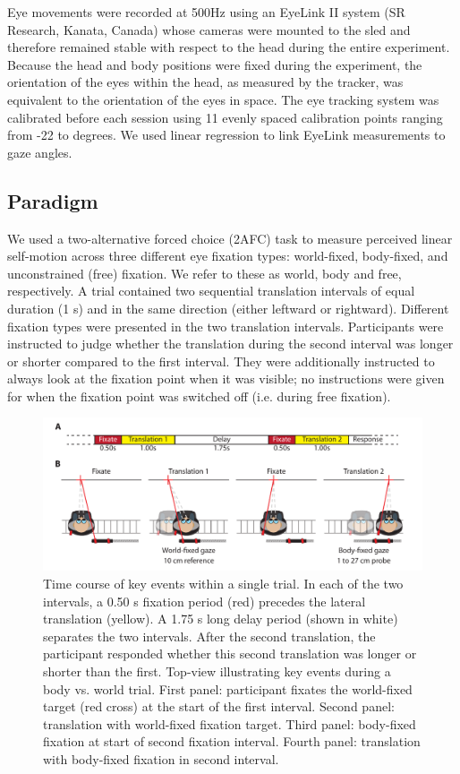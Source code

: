 Eye movements were recorded at 500\si{\hertz} using an EyeLink II system (SR Research, Kanata, Canada) whose cameras were mounted to the sled and therefore remained stable with respect to the head during the entire experiment. Because the head and body positions were fixed during the experiment, the orientation of the eyes within the head, as measured by the tracker, was equivalent to the orientation of the eyes in space. The eye tracking system was calibrated before each session using 11 evenly spaced calibration points ranging from -22 to  degrees. We used linear regression to link EyeLink measurements to gaze angles.

\subsection{Paradigm}
We used a two-alternative forced choice (2AFC) task to measure perceived linear self-motion across three different eye fixation types: world-fixed, body-fixed, and unconstrained (free) fixation. We refer to these as world, body and free, respectively. A trial contained two sequential translation intervals of equal duration (1 \si{\second}) and in the same direction (either leftward or rightward). Different fixation types were presented in the two translation intervals. Participants were instructed to judge whether the translation during the second interval was longer or shorter compared to the first interval. They were additionally instructed to always look at the fixation point when it was visible; no instructions were given for when the fixation point was switched off (i.e. during free fixation).


\begin{figure}
    \includegraphics[width=1.0\textwidth]{src/paper3/figure1.pdf}

    \caption{ Time course of key events within a single trial. In each of the two intervals, a 0.50 \si{\second} fixation period (red) precedes the lateral translation (yellow). A 1.75 \si{\second} long delay period (shown in white) separates the two intervals. After the second translation, the participant responded whether this second translation was longer or shorter than the first.  Top-view illustrating key events during a body vs. world trial. First panel: participant fixates the world-fixed target (red cross) at the start of the first interval. Second panel: translation with world-fixed fixation target. Third panel: body-fixed fixation at start of second fixation interval. Fourth panel: translation with body-fixed fixation in second interval.}
    \label{p3:fig1}
\end{figure}

